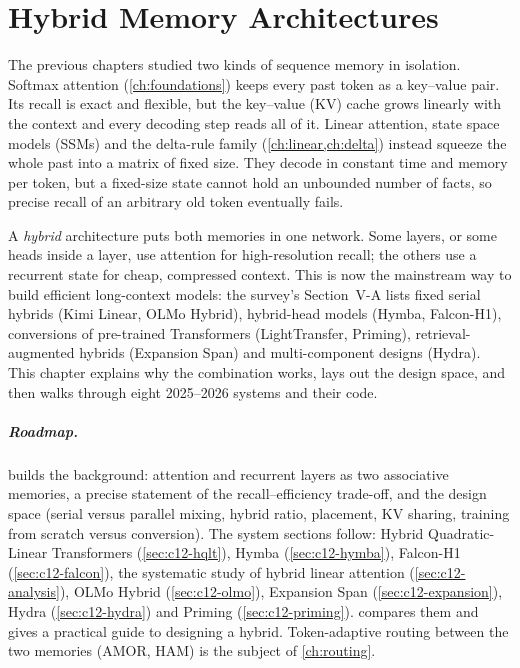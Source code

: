 \chapter{Hybrid Memory Architectures}\label{ch:hybrid}

The previous chapters studied two kinds of sequence memory in isolation. Softmax attention
(\cref{ch:foundations}) keeps every past token as a key--value pair. Its recall is exact and
flexible, but the key--value (KV) cache grows linearly with the context and every decoding step
reads all of it. Linear attention, state space models (SSMs) and the delta-rule family
(\cref{ch:linear,ch:delta}) instead squeeze the whole past into a matrix of fixed size. They
decode in constant time and memory per token, but a fixed-size state cannot hold an unbounded
number of facts, so precise recall of an arbitrary old token eventually fails.

A \emph{hybrid} architecture puts both memories in one network. Some layers, or some heads
inside a layer, use attention for high-resolution recall; the others use a recurrent state for
cheap, compressed context. This is now the mainstream way to build efficient long-context
models: the survey's Section~V-A \citep{zhoubian2026memory} lists fixed serial hybrids (Kimi
Linear, OLMo Hybrid), hybrid-head models (Hymba, Falcon-H1), conversions of pre-trained
Transformers (LightTransfer, Priming), retrieval-augmented hybrids (Expansion Span) and
multi-component designs (Hydra). This chapter explains why the combination works, lays out the
design space, and then walks through eight 2025--2026 systems and their code.

\paragraph{Roadmap.}  builds the background: attention and recurrent
layers as two associative memories, a precise statement of the recall--efficiency trade-off,
and the design space (serial versus parallel mixing, hybrid ratio, placement, KV sharing,
training from scratch versus conversion). The system sections follow: Hybrid Quadratic-Linear
Transformers (\cref{sec:c12-hqlt}), Hymba (\cref{sec:c12-hymba}), Falcon-H1
(\cref{sec:c12-falcon}), the systematic study of hybrid linear attention
(\cref{sec:c12-analysis}), OLMo Hybrid (\cref{sec:c12-olmo}), Expansion Span
(\cref{sec:c12-expansion}), Hydra (\cref{sec:c12-hydra}) and Priming (\cref{sec:c12-priming}).
 compares them and gives a practical guide to designing a hybrid.
Token-adaptive routing between the two memories (AMOR, HAM) is the subject of
\cref{ch:routing}.

